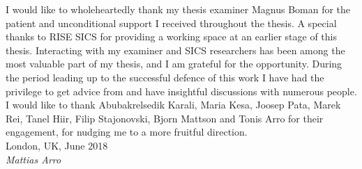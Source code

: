 I would like to wholeheartedly thank my thesis examiner Magnus Boman for the patient and unconditional support I received throughout the thesis.
A special thanks to RISE SICS for providing a working space at an earlier stage of this thesis.
Interacting with my examiner and SICS researchers has been among the most valuable part of my thesis, and I am grateful for the opportunity.
During the period leading up to the successful defence of this work I have had the privilege to get advice from and have insightful discussions with numerous people.
I would like to thank Abubakrelsedik Karali, Maria Kesa, Joosep Pata, Marek Rei, Tanel Hiir, Filip Stajonovski, Bjorn Mattson and Tonis Arro for their engagement, for nudging me to a more fruitful direction.\\

\noindent
London, UK, June 2018 \\
\textit{Mattias Arro}
\newpage
